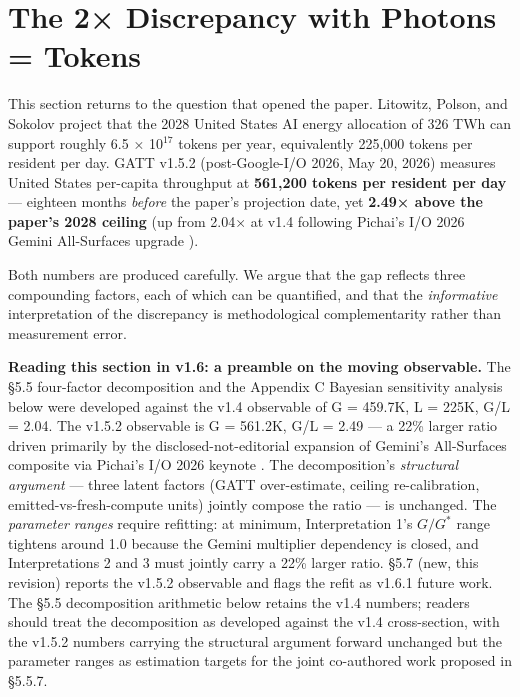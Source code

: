 \documentclass[11pt,a4paper]{article}
\begin{document}
\section{The 2× Discrepancy with Photons = Tokens}

This section returns to the question that opened the paper. Litowitz, Polson, and Sokolov \cite{litowitz2026photons} project that the 2028 United States AI energy allocation of 326 TWh can support roughly 6.5 × 10$^{17}$ tokens per year, equivalently 225,000 tokens per resident per day. GATT v1.5.2 (post-Google-I/O 2026, May 20, 2026) measures United States per-capita throughput at \textbf{561,200 tokens per resident per day} --- eighteen months \emph{before} the paper's projection date, yet \textbf{2.49× above the paper's 2028 ceiling} (up from 2.04× at v1.4 following Pichai's I/O 2026 Gemini All-Surfaces upgrade \cite{pichai2026io}).

Both numbers are produced carefully. We argue that the gap reflects three compounding factors, each of which can be quantified, and that the \emph{informative} interpretation of the discrepancy is methodological complementarity rather than measurement error.

\textbf{Reading this section in v1.6: a preamble on the moving observable.} The §5.5 four-factor decomposition and the Appendix C Bayesian sensitivity analysis below were developed against the v1.4 observable of G = 459.7K, L = 225K, G/L = 2.04. The v1.5.2 observable is G = 561.2K, G/L = 2.49 --- a 22\% larger ratio driven primarily by the disclosed-not-editorial expansion of Gemini's All-Surfaces composite via Pichai's I/O 2026 keynote \cite{pichai2026io}. The decomposition's \emph{structural argument} --- three latent factors (GATT over-estimate, ceiling re-calibration, emitted-vs-fresh-compute units) jointly compose the ratio --- is unchanged. The \emph{parameter ranges} require refitting: at minimum, Interpretation 1's $G/G^{*}$ range tightens around 1.0 because the Gemini multiplier dependency is closed, and Interpretations 2 and 3 must jointly carry a 22\% larger ratio. §5.7 (new, this revision) reports the v1.5.2 observable and flags the refit as v1.6.1 future work. The §5.5 decomposition arithmetic below retains the v1.4 numbers; readers should treat the decomposition as developed against the v1.4 cross-section, with the v1.5.2 numbers carrying the structural argument forward unchanged but the parameter ranges as estimation targets for the joint co-authored work proposed in §5.5.7.
\end{document}
